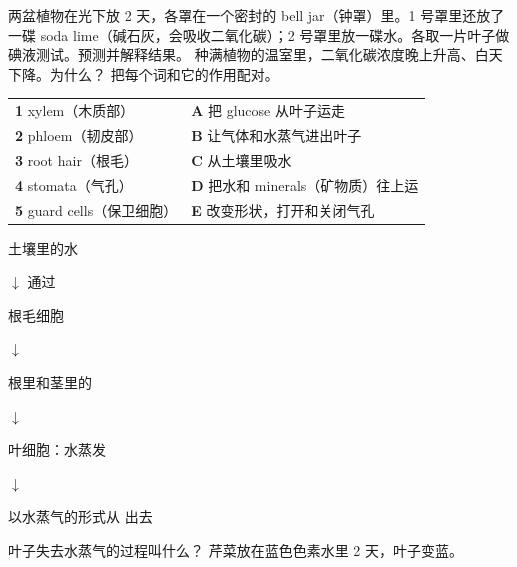  两盆植物在光下放 2 天，各罩在一个密封的 bell jar（钟罩）里。1 号罩里还放了一碟 soda lime（碱石灰，会吸收二氧化碳）；2 号罩里放一碟水。各取一片叶子做碘液测试。预测并解释结果。
 种满植物的温室里，二氧化碳浓度晚上升高、白天下降。为什么？
把每个词和它的作用配对。\par\vspace{2mm}
\begin{tabular}{@{}p{50mm}p{96mm}@{}}
\textbf{1} xylem（木质部） & \textbf{A} 把 glucose 从叶子运走\\
\textbf{2} phloem（韧皮部） & \textbf{B} 让气体和水蒸气进出叶子\\
\textbf{3} root hair（根毛） & \textbf{C} 从土壤里吸水\\
\textbf{4} stomata（气孔） & \textbf{D} 把水和 minerals（矿物质）往上运\\
\textbf{5} guard cells（保卫细胞） & \textbf{E} 改变形状，打开和关闭气孔\\
\end{tabular}
\vspace{2mm}
土壤里的水\par
\quad $\downarrow$ 通过 \gap[26mm]\par
根毛细胞\par
\quad $\downarrow$\par
根里和茎里的 \gap[26mm]\par
\quad $\downarrow$\par
叶细胞：水蒸发\par
\quad $\downarrow$\par
以水蒸气的形式从 \gap[26mm] 出去\par\vspace{3mm}
叶子失去水蒸气的过程叫什么？
芹菜放在蓝色色素水里 2 天，叶子变蓝。\par\vspace{2mm}
